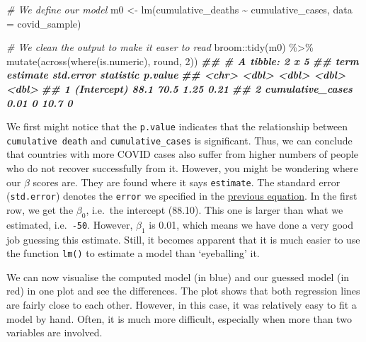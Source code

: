 \documentclass[
]{book}
\newenvironment{Shaded}{\begin{snugshade}}{\end{snugshade}}
\newcommand{\AttributeTok}[1]{\textcolor[rgb]{0.77,0.63,0.00}{#1}}
\newcommand{\CommentTok}[1]{\textcolor[rgb]{0.56,0.35,0.01}{\textit{#1}}}
\newcommand{\DecValTok}[1]{\textcolor[rgb]{0.00,0.00,0.81}{#1}}
\newcommand{\DocumentationTok}[1]{\textcolor[rgb]{0.56,0.35,0.01}{\textbf{\textit{#1}}}}
\newcommand{\FunctionTok}[1]{\textcolor[rgb]{0.00,0.00,0.00}{#1}}
\newcommand{\NormalTok}[1]{#1}
\newcommand{\OtherTok}[1]{\textcolor[rgb]{0.56,0.35,0.01}{#1}}
\newcommand{\SpecialCharTok}[1]{\textcolor[rgb]{0.00,0.00,0.00}{#1}}
\begin{document}
\begin{Shaded}
\begin{Highlighting}[]
\CommentTok{\# We define our model}
\NormalTok{m0 }\OtherTok{\textless{}{-}} \FunctionTok{lm}\NormalTok{(cumulative\_deaths }\SpecialCharTok{\textasciitilde{}}\NormalTok{ cumulative\_cases, }\AttributeTok{data =}\NormalTok{ covid\_sample)}

\CommentTok{\# We clean the output to make it easer to read}
\NormalTok{broom}\SpecialCharTok{::}\FunctionTok{tidy}\NormalTok{(m0) }\SpecialCharTok{\%\textgreater{}\%}
  \FunctionTok{mutate}\NormalTok{(}\FunctionTok{across}\NormalTok{(}\FunctionTok{where}\NormalTok{(is.numeric), round, }\DecValTok{2}\NormalTok{))}
\DocumentationTok{\#\# \# A tibble: 2 x 5}
\DocumentationTok{\#\#   term             estimate std.error statistic p.value}
\DocumentationTok{\#\#   \textless{}chr\textgreater{}               \textless{}dbl\textgreater{}     \textless{}dbl\textgreater{}     \textless{}dbl\textgreater{}   \textless{}dbl\textgreater{}}
\DocumentationTok{\#\# 1 (Intercept)         88.1       70.5      1.25    0.21}
\DocumentationTok{\#\# 2 cumulative\_cases     0.01       0       10.7     0}
\end{Highlighting}
\end{Shaded}

We first might notice that the \texttt{p.value} indicates that the relationship between \texttt{cumulative\ death} and \texttt{cumulative\_cases} is significant. Thus, we can conclude that countries with more COVID cases also suffer from higher numbers of people who do not recover successfully from it. However, you might be wondering where our \(\beta\) scores are. They are found where it says \texttt{estimate}. The standard error (\texttt{std.error}) denotes the \texttt{error} we specified in the \protect\hyperlink{single-linear-regression}{previous equation}. In the first row, we get the \(\beta_0\), i.e.~the intercept (88.10). This one is larger than what we estimated, i.e.~\texttt{-50}. However, \(\beta_1\) is 0.01, which means we have done a very good job guessing this estimate. Still, it becomes apparent that it is much easier to use the function \texttt{lm()} to estimate a model than `eyeballing' it.

We can now visualise the computed model (in blue) and our guessed model (in red) in one plot and see the differences. The plot shows that both regression lines are fairly close to each other. However, in this case, it was relatively easy to fit a model by hand. Often, it is much more difficult, especially when more than two variables are involved.
\end{document}
